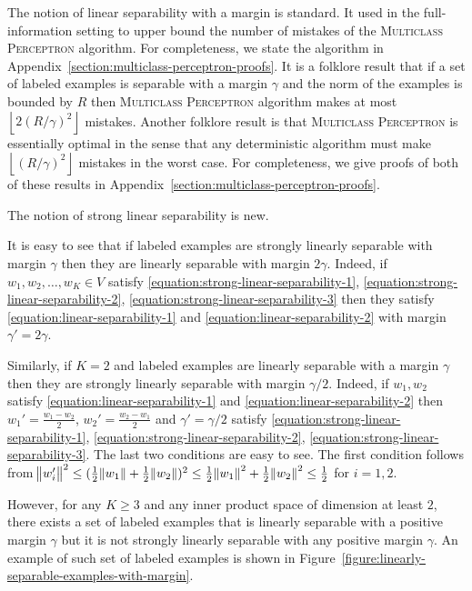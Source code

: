 The notion of linear separability with a margin is standard. It used in the
full-information setting to upper bound the number of mistakes of the
\textsc{Multiclass Perceptron} algorithm. For completeness, we state the
algorithm in Appendix~\ref{section:multiclass-perceptron-proofs}. It is a
folklore result that if a set of labeled examples is separable with a margin
$\gamma$ and the norm of the examples is bounded by $R$ then \textsc{Multiclass
Perceptron} algorithm makes at most $\left\lfloor 2(R/\gamma)^2 \right \rfloor$
mistakes. Another folklore result is that \textsc{Multiclass Perceptron} is
essentially optimal in the sense that any deterministic algorithm must make
$\left\lfloor (R/\gamma)^2 \right \rfloor$ mistakes in the worst case. For
completeness, we give proofs of both of these results in
Appendix~\ref{section:multiclass-perceptron-proofs}.

The notion of strong linear separability is new.

It is easy to see that if labeled examples are strongly linearly
separable with margin $\gamma$ then they are linearly separable with margin
$2\gamma$. Indeed, if $w_1, w_2, \dots, w_K \in V$
satisfy \eqref{equation:strong-linear-separability-1},
\eqref{equation:strong-linear-separability-2},
\eqref{equation:strong-linear-separability-3} then they satisfy
\eqref{equation:linear-separability-1} and
\eqref{equation:linear-separability-2} with margin $\gamma' = 2\gamma$.

Similarly, if $K=2$ and labeled examples are linearly separable with a margin
$\gamma$ then they are strongly linearly separable with margin $\gamma/2$.
Indeed, if $w_1, w_2$ satisfy \eqref{equation:linear-separability-1} and
\eqref{equation:linear-separability-2} then $w_1' = \frac{w_1 - w_2}{2}$, $w_2' =
\frac{w_2 - w_1}{2}$ and $\gamma'=\gamma/2$ satisfy
\eqref{equation:strong-linear-separability-1},
\eqref{equation:strong-linear-separability-2},
\eqref{equation:strong-linear-separability-3}. The last two conditions are easy
to see. The first condition follows from $\norm{w_i'}^2 \le (\frac{1}{2}
\norm{w_1} + \frac{1}{2} \norm{w_2})^2 \le \frac{1}{2}\norm{w_1}^2 +
\frac{1}{2}\norm{w_2}^2 \le \frac{1}{2}$ for $i=1,2$.

However, for any $K \ge 3$ and any inner product space of dimension at least
$2$, there exists a set of labeled examples that is linearly separable with a
positive margin $\gamma$ but it is not strongly linearly separable with any
positive margin $\gamma$. An example of such set of labeled examples is shown in
Figure~\ref{figure:linearly-separable-examples-with-margin}.

